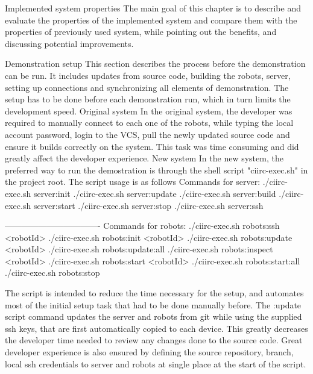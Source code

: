 \chap Implemented system properties
The main goal of this chapter is to describe and evaluate the properties of the implemented system and compare them with the properties of previously used system, while pointing out the benefits, and discussing potential improvements.

\sec Demonstration setup
This section describes the process before the demonstration can be run. It includes updates from source code, building the robots, server, setting up connections and synchronizing all elements of demonstration. The setup has to be done before each demonstration run, which in turn limits the development speed.
\secc Original system
In the original system, the developer was required to manually connect to each one of the robots, while typing the local account password, login to the VCS, pull the newly updated source code and ensure it builds correctly on the system. This task was time consuming and did greatly affect the developer experience.
\secc New system
In the new system, the preferred way to run the demostration is through the shell script "ciirc-exec.sh" in the project root. The script usage is as follows
\begtt
Commands for server:
./ciirc-exec.sh server:init
./ciirc-exec.sh server:update
./ciirc-exec.sh server:build
./ciirc-exec.sh server:start
./ciirc-exec.sh server:stop
./ciirc-exec.sh server:ssh

----------------------------------
Commands for robots:
./ciirc-exec.sh robots:ssh <robotId>
./ciirc-exec.sh robots:init <robotId>
./ciirc-exec.sh robots:update <robotId>
./ciirc-exec.sh robots:update:all
./ciirc-exec.sh robots:inspect <robotId>
./ciirc-exec.sh robots:start <robotId>
./ciirc-exec.sh robots:start:all
./ciirc-exec.sh robots:stop
\endtt

The script is intended to reduce the time necessary for the setup, and automates most of the initial setup task that had to be done manually before. The :update script command updates the server and robots from git while using the supplied ssh keys, that are first automatically copied to each device. This greatly decreases the developer time needed to review any changes done to the source code. Great developer experience is also ensured by defining the source repository, branch, local ssh credentials to server and robots at single place at the start of the script.

